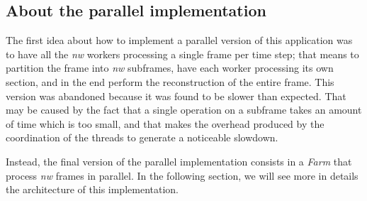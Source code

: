 \subsection{About the parallel implementation}
The first idea about how to implement a parallel version of this application was to have all the \emph{nw} workers processing a single frame per time step; that means to partition the frame into \emph{nw} subframes, have each worker processing its own section, and in the end perform the reconstruction of the entire frame. This version was abandoned because it was found to be slower than expected. That may be caused by the fact that a single operation on a subframe takes an amount of time which is too small, and that makes the overhead produced by the coordination of the threads to generate a noticeable slowdown.

Instead, the final version of the parallel implementation consists in a \emph{Farm} that process \emph{nw} frames in parallel. In the following section, we will see more in details the architecture of this implementation.